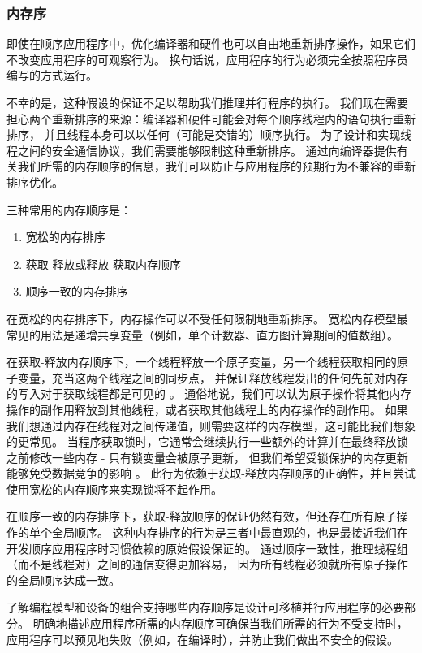 \subsubsection{内存序}
即使在顺序应用程序中，优化编译器和硬件也可以自由地重新排序操作，如果它们不改变应用程序的可观察行为。 
换句话说，应用程序的行为必须完全按照程序员编写的方式运行。

不幸的是，这种假设的保证不足以帮助我们推理并行程序的执行。 
我们现在需要担心两个重新排序的来源：编译器和硬件可能会对每个顺序线程内的语句执行重新排序，
并且线程本身可以以任何（可能是交错的）顺序执行。 
为了设计和实现线程之间的安全通信协议，我们需要能够限制这种重新排序。 
通过向编译器提供有关我们所需的内存顺序的信息，我们可以防止与应用程序的预期行为不兼容的重新排序优化。

三种常用的内存顺序是：

\begin{enumerate}
	\item 宽松的内存排序

	\item 获取-释放或释放-获取内存顺序

	\item 顺序一致的内存排序
\end{enumerate}

在宽松的内存排序下，内存操作可以不受任何限制地重新排序。 
宽松内存模型最常见的用法是递增共享变量（例如，单个计数器、直方图计算期间的值数组）。

在获取-释放内存顺序下，一个线程释放一个原子变量，另一个线程获取相同的原子变量，充当这两个线程之间的同步点，
并保证释放线程发出的任何先前对内存的写入对于获取线程都是可见的 。 
通俗地说，我们可以认为原子操作将其他内存操作的副作用释放到其他线程，或者获取其他线程上的内存操作的副作用。 
如果我们想通过内存在线程对之间传递值，则需要这样的内存模型，这可能比我们想象的更常见。 
当程序获取锁时，它通常会继续执行一些额外的计算并在最终释放锁之前修改一些内存 - 只有锁变量会被原子更新，
但我们希望受锁保护的内存更新能够免受数据竞争的影响 。 
此行为依赖于获取-释放内存顺序的正确性，并且尝试使用宽松的内存顺序来实现锁将不起作用。

在顺序一致的内存排序下，获取-释放顺序的保证仍然有效，但还存在所有原子操作的单个全局顺序。 
这种内存排序的行为是三者中最直观的，也是最接近我们在开发顺序应用程序时习惯依赖的原始假设保证的。 
通过顺序一致性，推理线程组（而不是线程对）之间的通信变得更加容易，
因为所有线程必须就所有原子操作的全局顺序达成一致。

了解编程模型和设备的组合支持哪些内存顺序是设计可移植并行应用程序的必要部分。 
明确地描述应用程序所需的内存顺序可确保当我们所需的行为不受支持时，
应用程序可以预见地失败（例如，在编译时），并防止我们做出不安全的假设。

